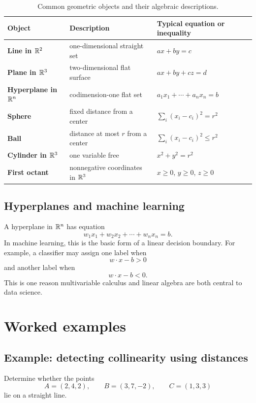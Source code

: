 \begin{table}[H]
\centering
\renewcommand{\arraystretch}{1.2}
\begin{tabularx}{\textwidth}{>{\bfseries}p{}X p{}}
\toprule
Object & Description & Typical equation or inequality \\
\midrule
Line in $\mathbb{R}^2$ & one-dimensional straight set & $ax+by=c$ \\
Plane in $\mathbb{R}^3$ & two-dimensional flat surface & $ax+by+cz=d$ \\
Hyperplane in $\mathbb{R}^n$ & codimension-one flat set & $a_1x_1+\cdots+a_nx_n=b$ \\
Sphere & fixed distance from a center & $\sum_i(x_i-c_i)^2=r^2$ \\
Ball & distance at most $r$ from a center & $\sum_i(x_i-c_i)^2\le r^2$ \\
Cylinder in $\mathbb{R}^3$ & one variable free & $x^2+y^2=r^2$ \\
First octant & nonnegative coordinates in $\mathbb{R}^3$ & $x\ge0$, $y\ge0$, $z\ge0$ \\
\bottomrule
\end{tabularx}
\caption{Common geometric objects and their algebraic descriptions.}
\label{tab:standard-geometric-objects}
\end{table}

\subsection*{Hyperplanes and machine learning}

A hyperplane in $\mathbb{R}^n$ has equation
\[
  w_1x_1+w_2x_2+\cdots+w_nx_n=b.
\]
In machine learning, this is the basic form of a linear decision boundary. For example, a classifier may assign one label when
\[
  w\cdot x-b>0
\]
and another label when
\[
  w\cdot x-b<0.
\]
This is one reason multivariable calculus and linear algebra are both central to data science.

\section{Worked examples}

\subsection*{Example: detecting collinearity using distances}

Determine whether the points
\[
  A=(2,4,2),\qquad B=(3,7,-2),\qquad C=(1,3,3)
\]
lie on a straight line.


